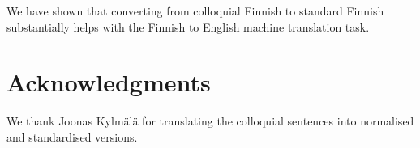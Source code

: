 \documentclass[11pt]{article}
\begin{document}
We have shown that converting from colloquial Finnish to standard Finnish substantially
helps with the Finnish to English machine translation task.

\section*{Acknowledgments}

We thank Joonas Kylm\"{a}l\"{a} for translating the colloquial sentences into normalised and standardised versions.



\end{document}

